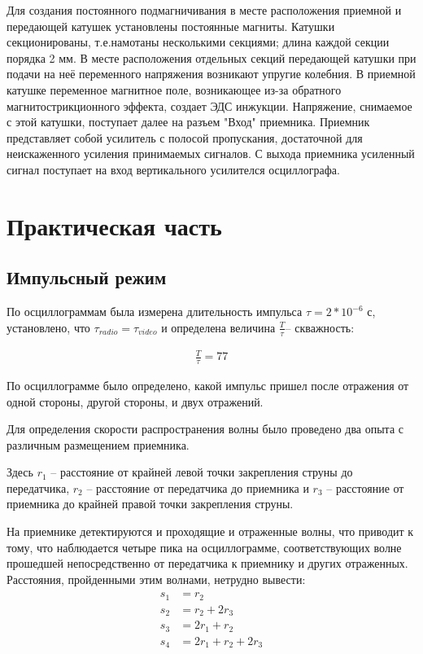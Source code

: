 Для создания постоянного подмагничивания в месте расположения приемной и передающей катушек установлены постоянные магниты. Катушки секционированы, т.е.намотаны несколькими секциями; длина каждой секции порядка 2 мм. В месте расположения отдельных секций передающей катушки при подачи на неё переменного напряжения возникают упругие колебния. В приемной катушке переменное магнитное поле, возникающее из-за обратного магнитострикционного эффекта, создает ЭДС инжукции. Напряжение, снимаемое с этой катушки, поступает далее на разъем "Вход" приемника. Приемник представляет собой усилитель с полосой пропускания, достаточной для неискаженного усиления принимаемых сигналов. С выхода приемника усиленный сигнал поступает на вход вертикального усилителся осциллографа.

\section{Практическая часть}
\subsection{Импульсный режим}
По осциллограммам была измерена длительность импульса $\tau=2*10^{-6}$ с, установлено, что $\tau_{radio}=\tau_{video}$  и определена величина $\frac{T}{\tau}$-- скважность:

\begin{gather*}
	\frac{T}{\tau}=77
\end{gather*}

По осциллограмме было определено, какой импульс пришел после отражения от одной стороны, другой стороны, и двух отражений.

Для определения скорости распространения волны было проведено два опыта с различным размещением приемника.



Здесь $r_1$ -- расстояние от крайней левой точки закрепления струны до передатчика, $r_2$ -- расстояние от передатчика до приемника и $r_3$ -- расстояние от приемника до крайней правой точки закрепления струны.

На приемнике детектируются и проходящие и отраженные волны, что приводит к тому, что наблюдается четыре пика на осциллограмме, соответствующих волне прошедшей непосредственно от передатчика к приемнику и других отраженных. Расстояния, пройденными этим волнами, нетрудно вывести:
\begin{gather}
\begin{aligned}
	s_1&=r_2\\
	s_2&=r_2+2r_3\\
	s_3&=2r_1+r_2\\
	s_4&=2r_1+r_2+2r_3\\
\end{aligned}
\end{gather}   

